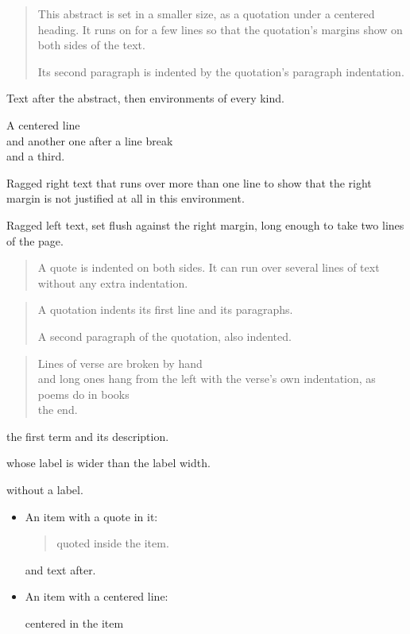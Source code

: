 \documentclass{article}
\begin{document}
\begin{abstract}
This abstract is set in a smaller size, as a quotation under a centered heading. It runs on for a few lines so that the quotation's margins show on both sides of the text.

Its second paragraph is indented by the quotation's paragraph indentation.
\end{abstract}
Text after the abstract, then environments of every kind.
\begin{center}
A centered line\\
and another one after a line break\\
and a third.
\end{center}
\begin{flushleft}
Ragged right text that runs over more than one line to show that the right margin is not justified at all in this environment.
\end{flushleft}
\begin{flushright}
Ragged left text, set flush against the right margin, long enough to take two lines of the page.
\end{flushright}
\begin{quote}
A quote is indented on both sides. It can run over several lines of text without any extra indentation.
\end{quote}
\begin{quotation}
A quotation indents its first line and its paragraphs.

A second paragraph of the quotation, also indented.
\end{quotation}
\begin{verse}
Lines of verse are broken by hand\\
and long ones hang from the left with the verse's own indentation, as poems do in books\\
the end.
\end{verse}
\begin{description}
\item[First] the first term and its description.
\item[A much longer term] whose label is wider than the label width.
\item without a label.
\end{description}
\begin{itemize}
\item An item with a quote in it:
  \begin{quote}
  quoted inside the item.
  \end{quote}
  and text after.
\item An item with a centered line:
  \begin{center}
  centered in the item
  \end{center}
\end{itemize}
\end{document}

